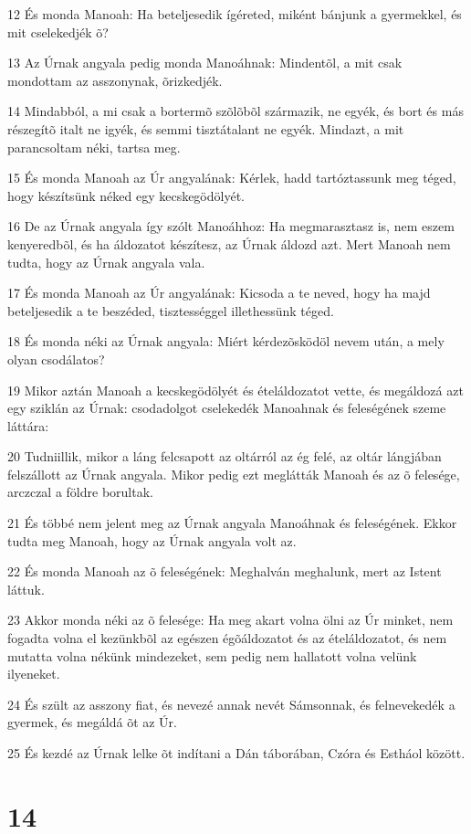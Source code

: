\par 12 És monda Manoah: Ha beteljesedik ígéreted, miként bánjunk a gyermekkel, és mit cselekedjék õ?
\par 13 Az Úrnak angyala pedig monda Manoáhnak: Mindentõl, a mit csak mondottam az asszonynak, õrizkedjék.
\par 14 Mindabból, a mi csak a bortermõ szõlõbõl származik, ne egyék, és bort és más részegítõ italt ne igyék, és semmi tisztátalant ne egyék. Mindazt, a mit parancsoltam néki, tartsa meg.
\par 15 És monda Manoah az Úr angyalának: Kérlek, hadd tartóztassunk meg téged, hogy készítsünk néked egy kecskegödölyét.
\par 16 De az Úrnak angyala így szólt Manoáhhoz: Ha megmarasztasz is, nem eszem kenyeredbõl, és ha áldozatot készítesz, az Úrnak áldozd azt. Mert Manoah nem tudta, hogy az Úrnak angyala vala.
\par 17 És monda Manoah az Úr angyalának: Kicsoda a te neved, hogy ha majd beteljesedik a te beszéded, tisztességgel illethessünk téged.
\par 18 És monda néki az Úrnak angyala: Miért kérdezõsködöl nevem után, a mely olyan csodálatos?
\par 19 Mikor aztán Manoah a kecskegödölyét és ételáldozatot vette, és megáldozá azt egy sziklán az Úrnak: csodadolgot cselekedék Manoahnak és feleségének szeme láttára:
\par 20 Tudniillik, mikor a láng felcsapott az oltárról az ég felé, az oltár lángjában felszállott az Úrnak angyala. Mikor pedig ezt meglátták Manoah és az õ felesége, arczczal a földre borultak.
\par 21 És többé nem jelent meg az Úrnak angyala Manoáhnak és feleségének. Ekkor tudta meg Manoah, hogy az Úrnak angyala volt az.
\par 22 És monda Manoah az õ feleségének: Meghalván meghalunk, mert az Istent láttuk.
\par 23 Akkor monda néki az õ felesége: Ha meg akart volna ölni az Úr minket, nem fogadta volna el kezünkbõl az egészen égõáldozatot és az ételáldozatot, és nem mutatta volna nékünk mindezeket, sem pedig nem hallatott volna velünk ilyeneket.
\par 24 És szült az asszony fiat, és nevezé annak nevét Sámsonnak, és felnevekedék a gyermek, és megáldá õt az Úr.
\par 25 És kezdé az Úrnak lelke õt indítani a Dán táborában, Czóra és Estháol között.

\chapter{14}

